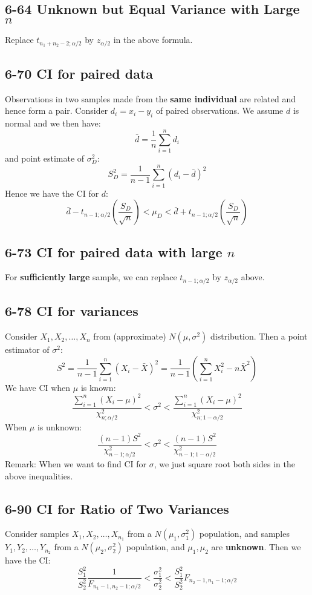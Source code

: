 \documentclass[12pt,landscape]{article}
\begin{document}
\begin{multicols}{3}
    \subsection{6-64 Unknown but Equal Variance with Large $n$}
    Replace $t_{n_1+n_2-2;\alpha/2}$ by $z_{\alpha/2}$ in the above formula.

    \subsection{6-70 CI for paired data}
    Observations in two samples made from the \textbf{same individual} are related and hence form a pair.
    Consider $d_i = x_i - y_i$ of paired observations. We assume $d$ is normal and we then have:
        $$ \bar{d} = \frac{1}{n}\sum_{i=1}^n d_i $$
    and point estimate of $\sigma_D^2$:
        $$ S_D^2 = \frac{1}{n-1}\sum_{i=1}^n (d_i - \bar{d})^2 $$
    Hence we have the CI for $d$:
        $$ \bar{d} - t_{n-1;\alpha/2}(\frac{S_D}{\sqrt{n}}) < \mu_D < \bar{d} + t_{n-1;\alpha/2}(\frac{S_D}{\sqrt{n}}) $$
    
    \subsection{6-73 CI for paired data with large $n$}
    For \textbf{sufficiently large} sample, we can replace $t_{n-1;\alpha/2}$ by $z_{\alpha/2}$ above.

    \subsection{6-78 CI for variances}
    Consider $X_1, X_2, \dots, X_n$ from (approximate) $N(\mu, \sigma^2)$ distribution. Then a point estimator of $\sigma^2$:
        $$ S^2 = \frac{1}{n-1}\sum_{i=1}^{n}(X_i-\bar{X})^2 = \frac{1}{n-1}(\sum_{i=1}^{n}X_i^2-n\bar{X}^2) $$
    We have CI when $\mu$ is known:
        $$ \frac{\sum_{i=1}^n(X_i-\mu)^2}{\chi^2_{n;\alpha/2}} < \sigma^2 < \frac{\sum_{i=1}^n(X_i-\mu)^2}{\chi^2_{n;1-\alpha/2}} $$
    When $\mu$ is unknown:
        $$ \frac{(n-1)S^2}{\chi^2_{n-1;\alpha/2}} < \sigma^2 < \frac{(n-1)S^2}{\chi^2_{n-1;1-\alpha/2}} $$
    Remark: When we want to find CI for $\sigma$, we just square root both sides in the above inequalities.
    
    \subsection{6-90 CI for Ratio of Two Variances}
    Consider samples $X_1, X_2, \dots, X_{n_1}$ from a $N(\mu_1, \sigma_1^2)$ population, and
    samples $Y_1, Y_2, \dots, Y_{n_2}$ from a $N(\mu_2, \sigma_2^2)$ population, and $\mu_1, \mu_2$ are \textbf{unknown}.
    Then we have the CI:
        $$ \frac{S_1^2}{S_2^2}\frac{1}{F_{n_1-1,n_2-1;\alpha/2}} < \frac{\sigma_1^2}{\sigma_2^2} < \frac{S_1^2}{S_2^2}F_{n_2-1,n_1-1;\alpha/2} $$



    \end{multicols}
\end{document}
